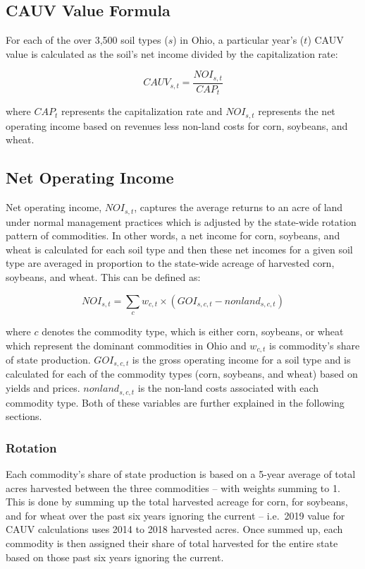 \documentclass[]{article}
\begin{document}
\hypertarget{cauv-value-formula}{%
\subsection{CAUV Value Formula}\label{cauv-value-formula}}

For each of the over 3,500 soil types (\(s\)) in Ohio, a particular
year's (\(t\)) CAUV value is calculated as the soil's net income divided
by the capitalization rate:

\[
CAUV_{s,t} = \frac{NOI_{s,t}}{CAP_t} \label{eq:cauv}
\]

where \(CAP_t\) represents the capitalization rate and \(NOI_{s,t}\)
represents the net operating income based on revenues less non-land
costs for corn, soybeans, and wheat.

\hypertarget{net-operating-income}{%
\subsection{Net Operating Income}\label{net-operating-income}}

Net operating income, \({NOI_{s,t}}\), captures the average returns to
an acre of land under normal management practices which is adjusted by
the state-wide rotation pattern of commodities. In other words, a net
income for corn, soybeans, and wheat is calculated for each soil type
and then these net incomes for a given soil type are averaged in
proportion to the state-wide acreage of harvested corn, soybeans, and
wheat. This can be defined as:

\[
NOI_{s,t} = \sum_{c} w_{c,t}\times(GOI_{s,c,t} - {nonland}_{s,c,t})
\]

where \(c\) denotes the commodity type, which is either corn, soybeans,
or wheat which represent the dominant commodities in Ohio and
\(w_{c,t}\) is commodity's share of state production. \(GOI_{s,c,t}\) is
the gross operating income for a soil type and is calculated for each of
the commodity types (corn, soybeans, and wheat) based on yields and
prices. \({nonland}_{s,c,t}\) is the non-land costs associated with each
commodity type. Both of these variables are further explained in the
following sections.

\hypertarget{rotation}{%
\subsubsection{Rotation}\label{rotation}}

Each commodity's share of state production is based on a 5-year average
of total acres harvested between the three commodities -- with weights
summing to 1. This is done by summing up the total harvested acreage for
corn, for soybeans, and for wheat over the past six years ignoring the
current -- i.e.~2019 value for CAUV calculations uses 2014 to 2018
harvested acres. Once summed up, each commodity is then assigned their
share of total harvested for the entire state based on those past six
years ignoring the current.
\end{document}
